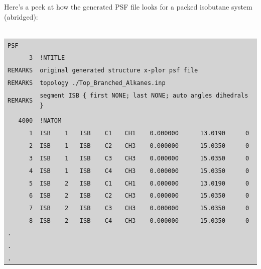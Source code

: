 Here's a peek at how the generated PSF file looks for a packed isobutane system (abridged):\\\\
\colorbox{lightgray}{
\begin{tabular}{r l l l l l l l l}
\multicolumn{9}{l}{\texttt{PSF}}\\
\texttt{3} & \multicolumn{8}{l}{\texttt{!NTITLE}} \\
\texttt{REMARKS} & \multicolumn{8}{l}{\texttt{original generated structure x-plor psf file}}\\
\texttt{REMARKS} & \multicolumn{8}{l}{\texttt{topology ./Top\_Branched\_Alkanes.inp}}\\
\texttt{REMARKS} & \multicolumn{8}{l}{\texttt{segment ISB \{ first NONE; last NONE; auto angles dihedrals \}}}\\\\
\texttt{4000} & \multicolumn{8}{l}{\texttt{!NATOM}}\\
\texttt{1} & \texttt{ISB} & \texttt{1} & \texttt{ISB} & \texttt{C1} & \texttt{CH1} & \texttt{0.000000} & \texttt{13.0190} & \texttt{0}\\
\texttt{2} & \texttt{ISB} & \texttt{1} & \texttt{ISB} & \texttt{C2} & \texttt{CH3} & \texttt{0.000000} & \texttt{15.0350} & \texttt{0}\\
\texttt{3} & \texttt{ISB} & \texttt{1} & \texttt{ISB} & \texttt{C3} & \texttt{CH3} & \texttt{0.000000} & \texttt{15.0350} & \texttt{0}\\
\texttt{4} & \texttt{ISB} & \texttt{1} & \texttt{ISB} & \texttt{C4} & \texttt{CH3} & \texttt{0.000000} & \texttt{15.0350} & \texttt{0}\\
\texttt{5} & \texttt{ISB} & \texttt{2} & \texttt{ISB} & \texttt{C1} & \texttt{CH1} & \texttt{0.000000} & \texttt{13.0190} & \texttt{0}\\
\texttt{6} & \texttt{ISB} & \texttt{2} & \texttt{ISB} & \texttt{C2} & \texttt{CH3} & \texttt{0.000000} & \texttt{15.0350} & \texttt{0}\\
\texttt{7} & \texttt{ISB} & \texttt{2} & \texttt{ISB} & \texttt{C3} & \texttt{CH3} & \texttt{0.000000} & \texttt{15.0350} & \texttt{0}\\
\texttt{8} & \texttt{ISB} & \texttt{2} & \texttt{ISB} & \texttt{C4} & \texttt{CH3} & \texttt{0.000000} & \texttt{15.0350} & \texttt{0}\\
\multicolumn{9}{l}{\texttt{.}}\\
\multicolumn{9}{l}{\texttt{.}}\\
\multicolumn{9}{l}{\texttt{.}}\\

\end{tabular}}
